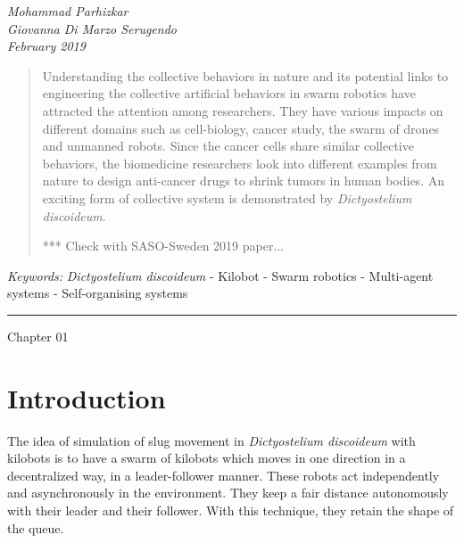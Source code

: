 \documentclass[11pt,a4paper]{article}
\begin{document}
\begin{center}
{ }
\vspace{2mm}

{\selectfont\textit{Mohammad Parhizkar \\ Giovanna Di Marzo Serugendo \\ \tiny{February 2019} }}


\end{center}
\begin{abstract}
Understanding the collective behaviors in nature and its potential links to engineering the collective artificial behaviors in swarm robotics have attracted the attention among researchers. They have various impacts on different domains such as cell-biology, cancer study, the swarm of drones and unmanned robots. Since the cancer cells share similar collective behaviors, the biomedicine researchers look into different examples from nature to design anti-cancer drugs to shrink tumors in human bodies. An exciting form of collective system is demonstrated by {\textit{Dictyostelium discoideum}}. 

*** Check with SASO-Sweden 2019 paper...

   \end{abstract}

{\footnotesize\textit{Keywords:} {\textit{Dictyostelium discoideum}} - Kilobot - Swarm robotics - Multi-agent systems - Self-organising systems}

{\begin{center}\noindent\rule{14cm}{0.4pt}\end{center}}
 Chapter 01
\section{Introduction}
The idea of simulation of slug movement in \textit{Dictyostelium discoideum} with kilobots is to have a swarm of kilobots which moves in one direction in a decentralized way, in a leader-follower manner. These robots act independently and asynchronously in the environment. They keep a fair distance autonomously with their leader and their follower. With this technique, they retain the shape of the queue.  
\end{document}
